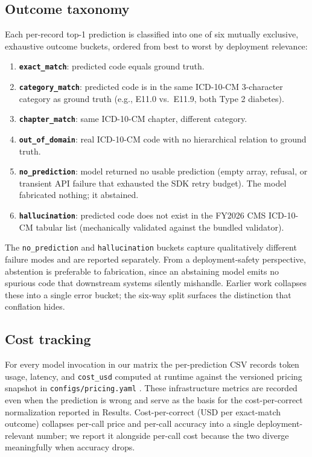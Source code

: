 \subsection{Outcome taxonomy}\label{outcome-taxonomy}

Each per-record top-1 prediction is classified into one of six
mutually exclusive, exhaustive outcome buckets, ordered from best
to worst by deployment relevance:

\begin{enumerate}
\def\labelenumi{\arabic{enumi}.}
\tightlist
\item
  \textbf{\texttt{exact\_match}}: predicted code equals ground truth.
\item
  \textbf{\texttt{category\_match}}: predicted code is in the same ICD-10-CM
  3-character category as ground truth (e.g., E11.0 vs.~E11.9, both
  Type 2 diabetes).
\item
  \textbf{\texttt{chapter\_match}}: same ICD-10-CM chapter, different category.
\item
  \textbf{\texttt{out\_of\_domain}}: real ICD-10-CM code with no hierarchical
  relation to ground truth.
\item
  \textbf{\texttt{no\_prediction}}: model returned no usable prediction (empty
  array, refusal, or transient API failure that exhausted the SDK
  retry budget). The model fabricated nothing; it abstained.
\item
  \textbf{\texttt{hallucination}}: predicted code does not exist in the FY2026
  CMS ICD-10-CM tabular list (mechanically validated against the
  bundled validator).
\end{enumerate}

The \texttt{no\_prediction} and \texttt{hallucination} buckets capture
qualitatively different failure modes and are reported separately.
From a deployment-safety perspective, abstention is preferable to
fabrication, since an abstaining model emits no spurious code that
downstream systems silently mishandle. Earlier work \autocite{Soroush2024}
collapses these into a single error bucket; the six-way split
surfaces the distinction that conflation hides.

\subsection{Cost tracking}\label{cost-tracking}

For every model invocation in our matrix the per-prediction CSV
records token usage, latency, and \texttt{cost\_usd} computed at runtime
against the versioned pricing snapshot in \texttt{configs/pricing.yaml}
\autocite{OpenAIPricing2026,GeminiPricing2026}. These infrastructure
metrics are recorded even when the prediction is wrong and serve
as the basis for the cost-per-correct normalization reported in
Results. Cost-per-correct (USD per exact-match outcome) collapses
per-call price and per-call accuracy into a single
deployment-relevant number; we report it alongside per-call cost
because the two diverge meaningfully when accuracy drops.

